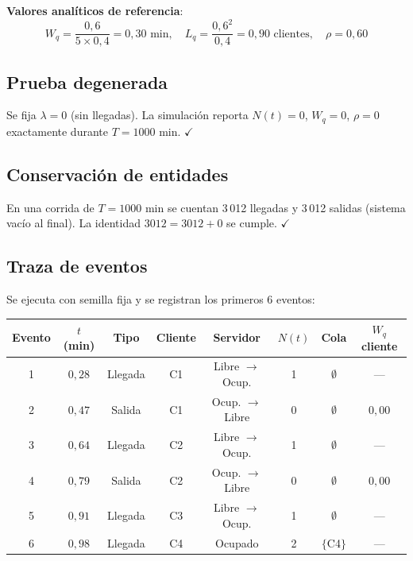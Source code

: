 \documentclass[11pt, letterpaper]{article}
\begin{document}
\textbf{Valores analíticos de referencia}:
\[
W_q = \frac{0{,}6}{5 \times 0{,}4} = 0{,}30 \text{ min}, \quad
L_q = \frac{0{,}6^2}{0{,}4} = 0{,}90 \text{ clientes}, \quad
\rho = 0{,}60
\]

\subsection{Prueba degenerada}

Se fija $\lambda=0$ (sin llegadas). La simulación reporta $N(t)=0$, $W_q=0$, $\rho=0$ exactamente durante $T=1000$ min. $\checkmark$

\subsection{Conservación de entidades}

En una corrida de $T=1000$ min se cuentan 3\,012 llegadas y 3\,012 salidas (sistema vacío al final). La identidad $3012 = 3012 + 0$ se cumple. $\checkmark$

\subsection{Traza de eventos}

Se ejecuta con semilla fija y se registran los primeros 6 eventos:

\begin{center}\small
\renewcommand{\arraystretch}{1.15}
\begin{tabular}{cccccccc}
\toprule
\textbf{Evento} & $t$ (min) & \textbf{Tipo} & \textbf{Cliente} & \textbf{Servidor} & $N(t)$ & \textbf{Cola} & $W_q$ cliente \\
\midrule
1 & $0{,}28$ & Llegada  & C1 & Libre $\to$ Ocup. & 1 & $\emptyset$ & --- \\
2 & $0{,}47$ & Salida   & C1 & Ocup. $\to$ Libre  & 0 & $\emptyset$ & $0{,}00$ \\
3 & $0{,}64$ & Llegada  & C2 & Libre $\to$ Ocup. & 1 & $\emptyset$ & --- \\
4 & $0{,}79$ & Salida   & C2 & Ocup. $\to$ Libre  & 0 & $\emptyset$ & $0{,}00$ \\
5 & $0{,}91$ & Llegada  & C3 & Libre $\to$ Ocup. & 1 & $\emptyset$ & --- \\
6 & $0{,}98$ & Llegada  & C4 & Ocupado           & 2 & $\{$C4$\}$ & --- \\
\bottomrule
\end{tabular}
\end{center}
\end{document}

